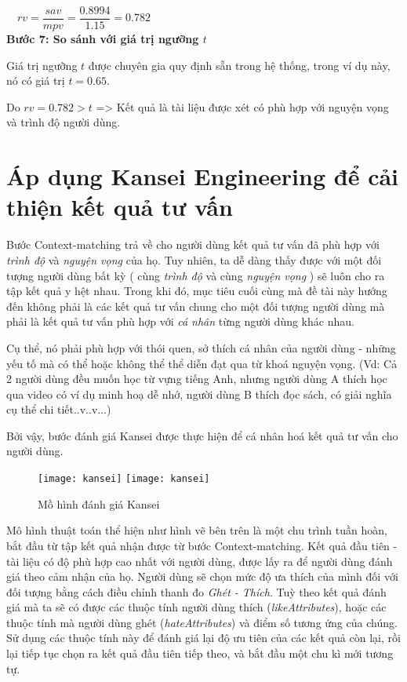 $\>$$\>$$\>$ $rv = \dfrac{sav}{mpv} = \dfrac{0.8994}{1.15} = 0.782 $\\

\textbf{Bước 7: So sánh với giá trị ngưỡng $t$}
\vskip 0.1in

Giá trị ngưỡng $t$ được chuyên gia quy định sẵn trong hệ thống, trong ví dụ này, nó có giá trị $t = 0.65$.

Do $rv = 0.782 > t$ => Kết quả là tài liệu được xét có phù hợp với nguyện vọng và trình độ người dùng.
	
\section{Áp dụng Kansei Engineering để cải thiện kết quả tư vấn}

Bước Context-matching trả về cho người dùng kết quả tư vấn đã phù hợp với \textit{trình độ} và \textit{nguyện vọng} của họ. Tuy nhiên, ta dễ dàng thấy được với một đối tượng người dùng bất kỳ ( cùng \textit{trình độ} và cùng \textit{nguyện vọng} ) sẽ luôn cho ra tập kết quả y hệt nhau. Trong khi đó, mục tiêu cuối cùng mà đề tài này hướng đến không phải là các kết quả tư vấn chung cho một đối tượng người dùng mà phải là kết quả tư vấn phù hợp với \textit{cá nhân} từng người dùng khác nhau.

 Cụ thể, nó phải phù hợp với thói quen, sở thích cá nhân của người dùng - những yếu tố mà có thể hoặc không thể thể diễn đạt qua từ khoá nguyện vọng. (Vd: Cả 2 người dùng đều muốn học từ vựng tiếng Anh, nhưng người dùng A thích học qua video có ví dụ minh hoạ dễ nhớ, người dùng B thích đọc sách, có giải nghĩa cụ thể chi tiết..v..v...)

 Bởi vậy, bước đánh giá Kansei được thực hiện để cá nhân hoá kết quả tư vấn cho người dùng.

\begin{figure}[H]
  \begin{center}
    \ifpdf
      \texttt{[image: kansei]}
    \else
      \texttt{[image: kansei]}
    \fi
    \caption{Mồ hình đánh giá Kansei}
    \label{KanseiModel}
  \end{center}
\end{figure}

Mô hình thuật toán thể hiện như hình vẽ bên trên là một chu trình tuần hoàn, bắt đầu từ tập kết quả nhận được từ bước Context-matching. Kết quả đầu tiên - tài liệu có độ phù hợp cao nhất với người dùng, được lấy ra để người dùng đánh giá theo cảm nhận của họ. Người dùng sẽ chọn mức độ ưa thích của mình đối với đối tượng bằng cách điều chỉnh thanh đo \textit{Ghét - Thích}. Tuỳ theo kết quả đánh giá mà ta sẽ có được các thuộc tính người dùng thích (\textit{likeAttributes}), hoặc các thuộc tính mà người dùng ghét (\textit{hateAttributes}) và điểm số tương ứng của chúng. Sử dụng các thuộc tính này để đánh giá lại độ ưu tiên của các kết quả còn lại, rồi lại tiếp tục chọn ra kết quả đầu tiên tiếp theo, và bắt đầu một chu kì mới tương tự. 


